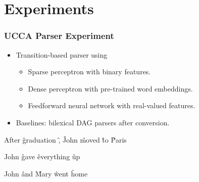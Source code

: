 \documentclass[t,handout,xcolor={svgnames}]{beamer}
\begin{document}
\section[]{Experiments}

\begin{frame}
\frametitle{UCCA Parser Experiment}
\begin{itemize}
 \item Transition-based parser using
 \begin{itemize}
   \item Sparse perceptron with binary features.
   \item Dense perceptron with pre-trained word embeddings.
   \item Feedforward neural network with real-valued features.
 \end{itemize}
 \item Baselines: bilexical DAG parsers after conversion.
\end{itemize}
\vspace*{\fill}
\begin{center}
	\begin{dependency}[theme = simple]
	\begin{deptext}[column sep=.7em,ampersand replacement=\^]
	After \^ graduation \^ , \^ John \^ moved \^ to \^ Paris \\
	\end{deptext}
	\end{dependency}
	\begin{dependency}[theme = simple]
	\begin{deptext}[column sep=.7em,ampersand replacement=\^]
	John \^ gave \^ everything \^ up \\
	\end{deptext}
	\end{dependency}
  \hspace*{\fill}
	\begin{dependency}[theme = simple]
	\begin{deptext}[column sep=.7em,ampersand replacement=\^]
	John \^ and \^ Mary \^ went \^ home \\
	\end{deptext}
	\end{dependency}
\end{center}
\end{frame}
\end{document}
